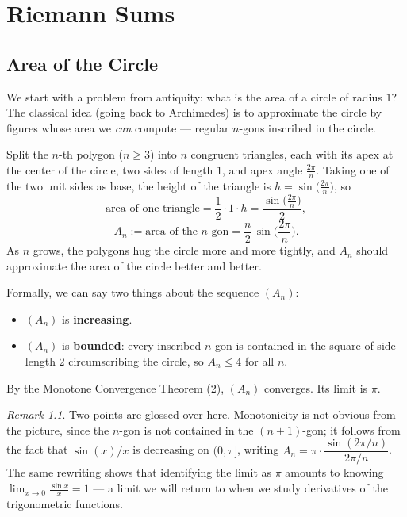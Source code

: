 \documentclass[
  letterpaper,
  DIV=11,
  numbers=noendperiod]{scrreprt}
\providecommand{\tightlist}{%
  \setlength{\itemsep}{0pt}\setlength{\parskip}{0pt}}
\theoremstyle{plain}
\theoremstyle{plain}
\theoremstyle{definition}
\theoremstyle{definition}
\theoremstyle{definition}
\theoremstyle{plain}
\theoremstyle{plain}
\theoremstyle{remark}
\newtheorem{refremark}{Remark}[chapter]
\begin{document}
\chapter{Riemann Sums}\label{riemann-sums}

\section{Area of the Circle}\label{area-of-the-circle}

We start with a problem from antiquity: what is the area of a circle of
radius \(1\)? The classical idea (going back to Archimedes) is to
approximate the circle by figures whose area we \emph{can} compute ---
regular \(n\)-gons inscribed in the circle.

Split the \(n\)-th polygon (\(n\ge3\)) into \(n\) congruent triangles,
each with its apex at the center of the circle, two sides of length
\(1\), and apex angle \(\tfrac{2\pi}{n}\). Taking one of the two unit
sides as base, the height of the triangle is
\(h = \sin\!\big(\tfrac{2\pi}{n}\big)\), so \[
\text{area of one triangle} = \frac12\cdot 1\cdot h = \frac{\sin\!\big(\tfrac{2\pi}{n}\big)}{2},
\] \[
A_n := \text{area of the $n$-gon} = \frac{n}{2}\,\sin\!\Big(\frac{2\pi}{n}\Big).
\] As \(n\) grows, the polygons hug the circle more and more tightly,
and \(A_n\) should approximate the area of the circle better and better.

Formally, we can say two things about the sequence \((A_n)\):

\begin{itemize}
\tightlist
\item
  \((A_n)\) is \textbf{increasing}.
\item
  \((A_n)\) is \textbf{bounded}: every inscribed \(n\)-gon is contained
  in the square of side length \(2\) circumscribing the circle, so
  \(A_n\le 4\) for all \(n\).
\end{itemize}

By the Monotone Convergence Theorem (2), \((A_n)\) converges. Its limit
is \(\pi\).

\begin{refremark}
Two points are glossed over here. Monotonicity is not obvious from the
picture, since the \(n\)-gon is not contained in the \((n+1)\)-gon; it
follows from the fact that \(\sin(x)/x\) is decreasing on \((0,\pi]\),
writing \(A_n = \pi\cdot\dfrac{\sin(2\pi/n)}{2\pi/n}\). The same
rewriting shows that identifying the limit as \(\pi\) amounts to knowing
\(\lim_{x\to0}\frac{\sin x}{x} = 1\) --- a limit we will return to when
we study derivatives of the trigonometric functions.

\label{rem-circle-area-details}

\end{refremark}
\end{document}
